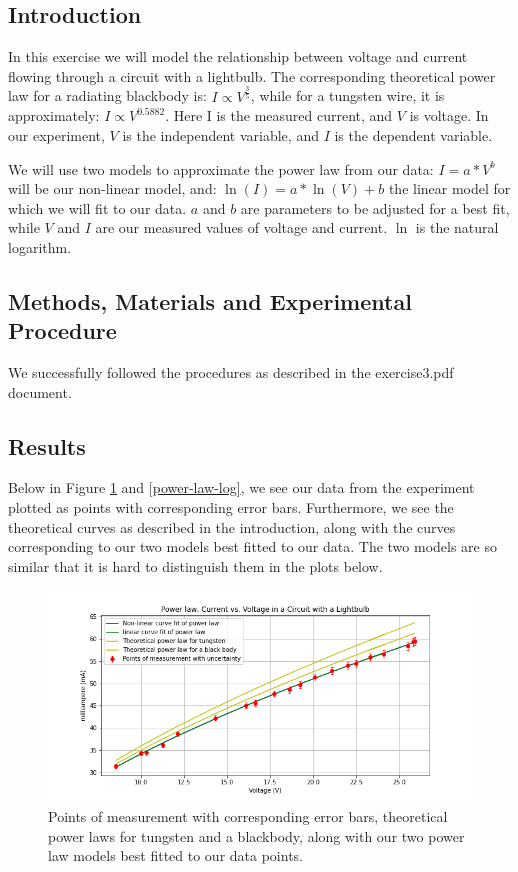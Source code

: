 \documentclass[letterpaper,12pt]{article}
\begin{document}
\subsection{Introduction}

In this exercise we will model the relationship between voltage and current flowing 
through a circuit with a lightbulb. The corresponding theoretical power law for a 
radiating blackbody is: $I \propto V^{\frac{3}{5}}$, while for a tungsten wire, it is approximately: 
$I \propto V^{0.5882}$. Here I is the measured current, and $V$ is voltage. In our experiment, 
$V$ is the independent variable, and $I$ is the dependent variable. 

We will use two models to approximate the power law from our data: $I = a*V^b$ 
will be our non-linear model, and: $\ln(I) = a*\ln(V)+b$ the linear model for which 
we will fit to our data. $a$ and $b$ are parameters to be adjusted for a best fit, 
while $V$ and $I$ are our measured values of voltage and current. $\ln$ is the natural logarithm.

\subsection{Methods, Materials and Experimental Procedure}

We successfully followed the procedures as described in the exercise3.pdf document\cite{lab-manual-ex2}.

\subsection{Results}
Below in Figure \ref{power-law} and \ref{power-law-log}, we see our data from the experiment plotted as points with 
corresponding error bars. Furthermore, we see the theoretical curves as described in the introduction, 
along with the curves corresponding to our two models best fitted to our data. 
The two models are so similar that it is hard to distinguish them in the plots below.

\begin{figure}[H]
  \centering
  \includegraphics[width=0.95\linewidth]{../Exercise3/Power_law.png}    
  \caption{Points of measurement with corresponding error bars, theoretical power laws for 
  tungsten and a blackbody, along with our two power law models best fitted to our data 
  points.}
  \label{power-law}
\end{figure}
\end{document}
